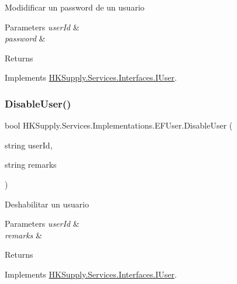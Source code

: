 Modidificar un password de un usuario 


\begin{DoxyParams}{Parameters}
{\em user\+Id} & \\
\hline
{\em password} & \\
\hline
\end{DoxyParams}
\begin{DoxyReturn}{Returns}

\end{DoxyReturn}


Implements \hyperlink{interface_h_k_supply_1_1_services_1_1_interfaces_1_1_i_user}{H\+K\+Supply.\+Services.\+Interfaces.\+I\+User}.

\mbox{\label{class_h_k_supply_1_1_services_1_1_implementations_1_1_e_f_user_acb2996bf9f333684786d3e2d7b702ba4}} 
\subsubsection{\texorpdfstring{Disable\+User()}{DisableUser()}}
{\footnotesize\ttfamily bool H\+K\+Supply.\+Services.\+Implementations.\+E\+F\+User.\+Disable\+User (\begin{DoxyParamCaption}\item[{string}]{user\+Id,  }\item[{string}]{remarks }\end{DoxyParamCaption})}



Deshabilitar un usuario 


\begin{DoxyParams}{Parameters}
{\em user\+Id} & \\
\hline
{\em remarks} & \\
\hline
\end{DoxyParams}
\begin{DoxyReturn}{Returns}

\end{DoxyReturn}


Implements \hyperlink{interface_h_k_supply_1_1_services_1_1_interfaces_1_1_i_user}{H\+K\+Supply.\+Services.\+Interfaces.\+I\+User}.

